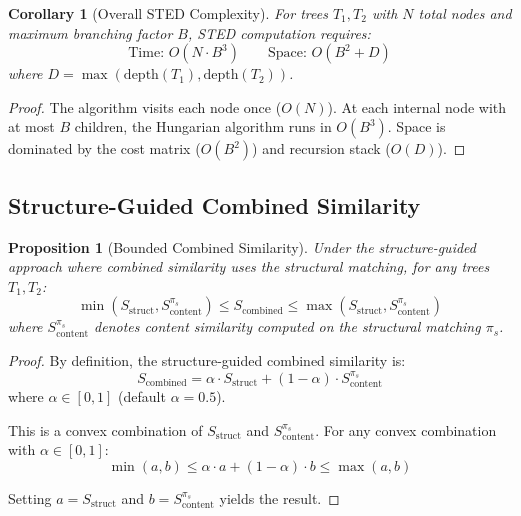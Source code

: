 \documentclass{article}
\newtheorem{proposition}[theorem]{Proposition}
\newtheorem{corollary}[theorem]{Corollary}
\begin{document}
\begin{corollary}[Overall STED Complexity]
\label{cor:complexity}
For trees $T_1, T_2$ with $N$ total nodes and maximum branching factor $B$, STED computation requires:
\begin{equation}
    \text{Time: } O(N \cdot B^3) \qquad \text{Space: } O(B^2 + D)
\end{equation}
where $D = \max(\text{depth}(T_1), \text{depth}(T_2))$.
\end{corollary}

\begin{proof}
The algorithm visits each node once ($O(N)$). At each internal node with at most $B$ children, the Hungarian algorithm runs in $O(B^3)$. Space is dominated by the cost matrix ($O(B^2)$) and recursion stack ($O(D)$).
\end{proof}

\subsection{Structure-Guided Combined Similarity}

\begin{proposition}[Bounded Combined Similarity]
\label{prop:bounded-combined}
Under the structure-guided approach where combined similarity uses the structural matching, for any trees $T_1, T_2$:
\begin{equation}
    \min(S_{\text{struct}}, S_{\text{content}}^{\pi_s}) \leq S_{\text{combined}} \leq \max(S_{\text{struct}}, S_{\text{content}}^{\pi_s})
\end{equation}
where $S_{\text{content}}^{\pi_s}$ denotes content similarity computed on the structural matching $\pi_s$.
\end{proposition}

\begin{proof}
By definition, the structure-guided combined similarity is:
\begin{equation}
    S_{\text{combined}} = \alpha \cdot S_{\text{struct}} + (1-\alpha) \cdot S_{\text{content}}^{\pi_s}
\end{equation}
where $\alpha \in [0,1]$ (default $\alpha = 0.5$).

This is a convex combination of $S_{\text{struct}}$ and $S_{\text{content}}^{\pi_s}$. For any convex combination with $\alpha \in [0,1]$:
\begin{equation}
    \min(a, b) \leq \alpha \cdot a + (1-\alpha) \cdot b \leq \max(a, b)
\end{equation}

Setting $a = S_{\text{struct}}$ and $b = S_{\text{content}}^{\pi_s}$ yields the result.
\end{proof}
\end{document}
